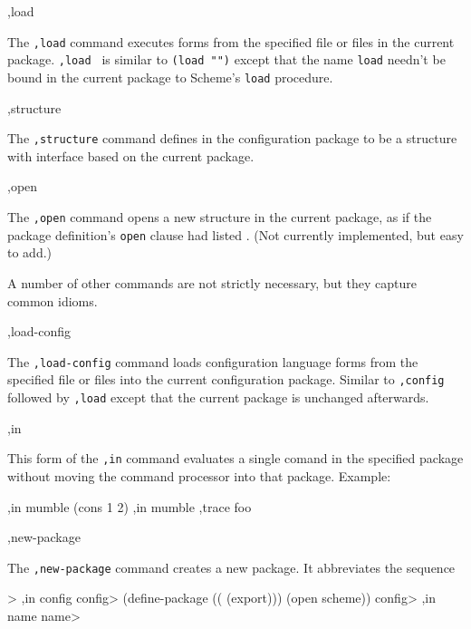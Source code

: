 \begin{list}{}{}{}
\item
\begin{code}
,load  \etc
\end{code}
    The {\tt,load} command executes forms from the specified file or
    files in the current package.  {\tt,load } is similar
    to {\tt(load "")}
    except that the name {\tt load} needn't be bound in the current
    package to Scheme's {\tt load} procedure.

\item
\begin{code}
,structure  
\end{code}
    The {\tt,structure} command defines  in the
    configuration package to be a structure with interface
     based on the current package.

\item
\begin{code}
,open 
\end{code}
    The {\tt,open} command opens a new structure in the current
    package, as if the package definition's {\tt open} clause
    had listed .  (Not currently implemented, but
    easy to add.)
\end{list}


A number of other commands are not strictly necessary, but they
capture common idioms.

\begin{list}{}{}{}
\item
\begin{code}
,load-config  \etc
\end{code}
    The {\tt,load-config} command loads configuration language forms from
    the specified file or files into the current configuration package.
    Similar to {\tt,config} followed by {\tt,load} except that the current
    package is unchanged afterwards.

\item
\begin{code}
,in  
\end{code}
    This form of the {\tt,in} command evaluates a single comand in the
    specified package without moving the command processor into that
    package.  Example:
\begin{code}
    ,in mumble (cons 1 2)
    ,in mumble ,trace foo
\end{code}

\item
\begin{code}
,new-package   \etc
\end{code}
    The {\tt,new-package} command creates a new package.  It
    abbreviates the sequence 
\begin{code}
    > ,in config
    config> (define-package (( (export)))
	      (open  \etc{} scheme))
    config> ,in name
    name> 
\end{code}

\end{list}



